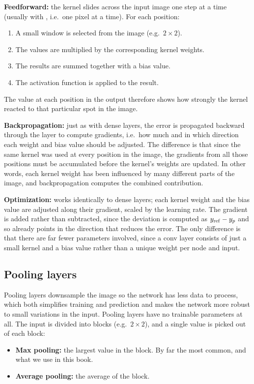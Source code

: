 \textbf{Feedforward:} the kernel slides across the input image one step at a time (usually with
, i.e.\ one pixel at a time). For each position:
\begin{enumerate}
  \item A small window is selected from the image (e.g.\ $2 \times 2$).
  \item The values are multiplied by the corresponding kernel weights.
  \item The results are summed together with a bias value.
  \item The activation function is applied to the result.
\end{enumerate}
The value at each position in the output therefore shows how strongly the kernel reacted to that
particular spot in the image.

\textbf{Backpropagation:} just as with dense layers, the error is propagated backward through the
layer to compute gradients, i.e.\ how much and in which direction each weight and bias value should
be adjusted. The difference is that since the same kernel was used at every position in the image,
the gradients from all those positions must be accumulated before the kernel's weights are updated.
In other words, each kernel weight has been influenced by many different parts of the image, and
backpropagation computes the combined contribution.

\textbf{Optimization:} works identically to dense layers; each kernel weight and the bias value are
adjusted along their gradient, scaled by the learning rate. The gradient is added rather than
subtracted, since the deviation is computed as $y_{\mathrm{ref}} - y_{p}$ and so already points in the
direction that reduces the error. The only difference is that there are far fewer parameters
involved, since a conv layer consists of just a small kernel and a bias value rather than a unique
weight per node and input.

\subsection{Pooling layers}
Pooling layers downsample the image so the network has less data to process, which both simplifies
training and prediction and makes the network more robust to small variations in the input. Pooling
layers have no trainable parameters at all. The input is divided into blocks (e.g.\ $2 \times 2$),
and a single value is picked out of each block:
\begin{itemize}
  \item \textbf{Max pooling:} the largest value in the block. By far the most common, and what we
    use in this book.
  \item \textbf{Average pooling:} the average of the block.
\end{itemize}

